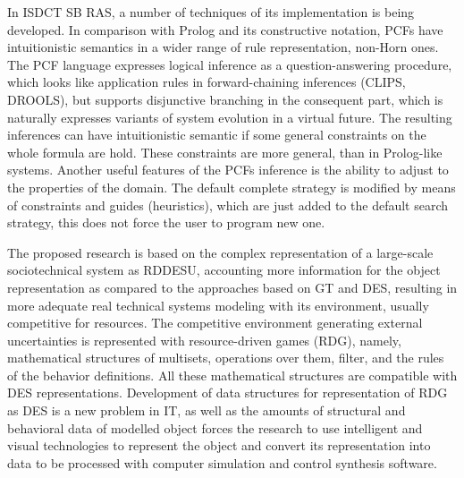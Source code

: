 \documentclass[conference]{IEEEtran}
\begin{document}
In ISDCT SB RAS, a number of techniques of its implementation is being developed. In comparison with Prolog and its constructive notation, PCFs have intuitionistic semantics in a wider range of rule representation, non-Horn ones. The PCF language expresses logical inference as a question-answering procedure, which looks like application rules in forward-chaining inferences (CLIPS, DROOLS), but supports disjunctive branching in the consequent part, which is naturally expresses variants of system evolution in a virtual future. The resulting inferences can have intuitionistic semantic if some general constraints on the whole formula are hold. These constraints are more general, than in Prolog-like systems. Another useful features of the PCFs inference is the ability to adjust to the properties of the domain. The default complete strategy is modified by means of constraints and guides (heuristics), which are just added to the default search strategy, this does not force the user to program new one.



The proposed research is based on the complex representation of a large-scale sociotechnical system as RDDESU, accounting more information for the object representation as compared to the approaches based on GT and DES, resulting in more adequate real technical systems modeling with its environment, usually competitive for resources. The competitive environment generating external uncertainties is represented with resource-driven games (RDG), namely, mathematical structures of multisets, operations over them, filter, and the rules of the behavior definitions.  All these mathematical structures are compatible with DES representations.  Development of data structures for representation of RDG as DES is a new problem in IT, as well as the amounts of structural and behavioral data of modelled object forces the research to use intelligent and visual technologies to represent the object and convert its representation into data to be processed with computer simulation and control synthesis software.


\end{document}
